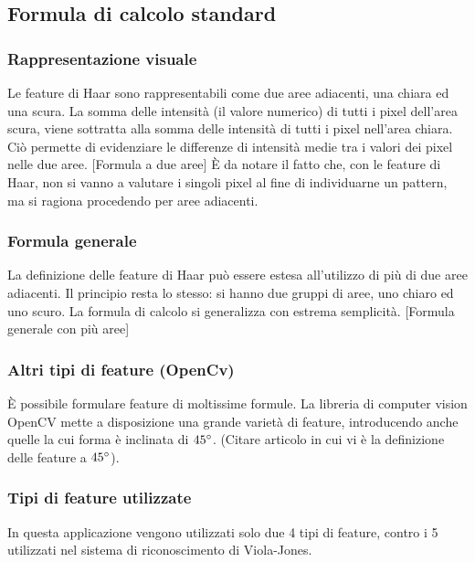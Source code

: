         \subsection{Formula di calcolo standard}
            \subsubsection{Rappresentazione visuale}
            Le feature di Haar sono rappresentabili come due aree adiacenti, una chiara ed una scura.
            La somma delle intensità (il valore numerico) di tutti i pixel dell'area scura, viene sottratta alla somma delle intensità di tutti i pixel nell'area chiara.
            Ciò permette di evidenziare le differenze di intensità medie tra i valori dei pixel nelle due aree.
            [Formula a due aree]
            È da notare il fatto che, con le feature di Haar, non si vanno a valutare i singoli pixel al fine di individuarne un pattern, ma si ragiona procedendo per aree adiacenti.

            \subsubsection{Formula generale}
            La definizione delle feature di Haar può essere estesa all'utilizzo di più di due aree adiacenti.
            Il principio resta lo stesso: si hanno due gruppi di aree, uno chiaro ed uno scuro.
            La formula di calcolo si generalizza con estrema semplicità.
            [Formula generale con più aree]

            \subsubsection{Altri tipi di feature (OpenCv)}
            È possibile formulare feature di moltissime formule.
            La libreria di computer vision OpenCV mette a disposizione una grande varietà di feature, introducendo anche quelle la cui forma è inclinata di $45\degree$. (Citare articolo in cui vi è la definizione delle feature a $45\degree$).

            \subsubsection{Tipi di feature utilizzate}
            In questa applicazione vengono utilizzati solo due 4 tipi di feature, contro i 5 utilizzati nel sistema di riconoscimento di Viola-Jones.

